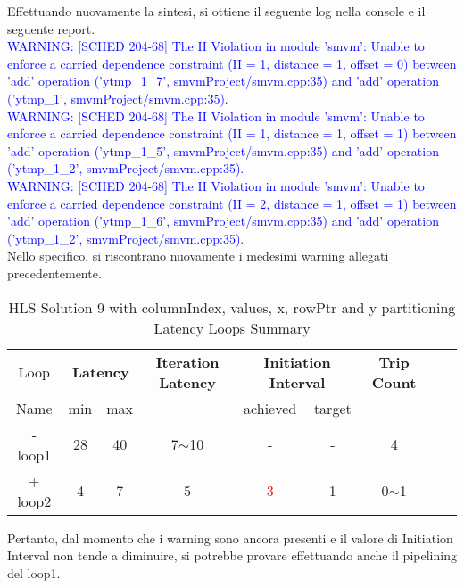 

Effettuando nuovamente la sintesi, si ottiene il seguente log nella console e il seguente report.
\\
\textcolor{blue}{WARNING: [SCHED 204-68] The II Violation in module 'smvm': Unable to enforce a carried dependence constraint (II = 1, distance = 1, offset = 0)
	between 'add' operation ('ytmp\_1\_7', smvmProject/smvm.cpp:35) and 'add' operation ('ytmp\_1', smvmProject/smvm.cpp:35).}
\\
\textcolor{blue}{WARNING: [SCHED 204-68] The II Violation in module 'smvm': Unable to enforce a carried dependence constraint (II = 1, distance = 1, offset = 1)
	between 'add' operation ('ytmp\_1\_5', smvmProject/smvm.cpp:35) and 'add' operation ('ytmp\_1\_2', smvmProject/smvm.cpp:35).}
\\
\textcolor{blue}{WARNING: [SCHED 204-68] The II Violation in module 'smvm': Unable to enforce a carried dependence constraint (II = 2, distance = 1, offset = 1)
	between 'add' operation ('ytmp\_1\_6', smvmProject/smvm.cpp:35) and 'add' operation ('ytmp\_1\_2', smvmProject/smvm.cpp:35).}
\\
Nello specifico, si riscontrano nuovamente i medesimi warning allegati precedentemente.

\begin{table}[H]
	\centering
	\begin{tabular}{|c|c|c|c|c|c|c|c|c|}
		\hline
		\multicolumn{1}{|c|}{Loop} & \multicolumn{2}{|c|}{\textbf{Latency}} & \multicolumn{1}{c|}{\textbf{Iteration Latency}} & \multicolumn{2}{c|}{\textbf{Initiation Interval}} & \multicolumn{1}{c|}{\textbf{Trip Count}}  \\
		Name & min & max &  & achieved & target &  \\
		\hline
		- loop1 & 28 & 40 & 7$\sim$10 & - & - & 4 \\
		+ loop2 & 4 & 7 & 5 & \textcolor{red}{3} & 1 & 0$\sim$1 \\
		\hline
	\end{tabular}
	\caption{HLS Solution 9 with columnIndex, values, x, rowPtr and y partitioning Latency Loops Summary}
	\label{tab:hls-solution-9-columnindex-values-partitioning-loop-summary}
\end{table}

Pertanto, dal momento che i warning sono ancora presenti e il valore di Initiation Interval non tende a diminuire, si potrebbe provare effettuando anche il pipelining del loop1.

